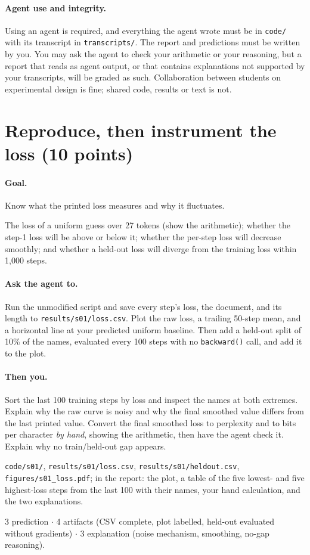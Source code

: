 \documentclass[11pt,letterpaper]{article}
\newcommand{\agent}[1]{\paragraph{Ask the agent to.} #1}
\newcommand{\you}[1]{\paragraph{Then you.} #1}
\newcommand{\goal}[1]{\paragraph{Goal.} #1}
\begin{document}
\paragraph{Agent use and integrity.} Using an agent is required, and everything the agent wrote must be in \texttt{code/} with its transcript in \texttt{transcripts/}. The report and predictions must be written by you. You may ask the agent to check your arithmetic or your reasoning, but a report that reads as agent output, or that contains explanations not supported by your transcripts, will be graded as such. Collaboration between students on experimental design is fine; shared code, results or text is not.

\clearpage
\section{Reproduce, then instrument the loss \hfill (10 points)}
\goal{Know what the printed loss measures and why it fluctuates.}
\begin{predict}
The loss of a uniform guess over 27 tokens (show the arithmetic); whether the step-1 loss will be above or below it; whether the per-step loss will decrease smoothly; and whether a held-out loss will diverge from the training loss within 1{,}000 steps.
\end{predict}
\agent{Run the unmodified script and save every step's loss, the document, and its length to \texttt{results/s01/loss.csv}. Plot the raw loss, a trailing 50-step mean, and a horizontal line at your predicted uniform baseline. Then add a held-out split of 10\% of the names, evaluated every 100 steps with no \texttt{backward()} call, and add it to the plot.}
\you{Sort the last 100 training steps by loss and inspect the names at both extremes. Explain why the raw curve is noisy and why the final smoothed value differs from the last printed value. Convert the final smoothed loss to perplexity and to bits per character \emph{by hand}, showing the arithmetic, then have the agent check it. Explain why no train/held-out gap appears.}
\begin{deliver}
\texttt{code/s01/}, \texttt{results/s01/loss.csv}, \texttt{results/s01/heldout.csv}, \texttt{figures/s01\_loss.pdf}; in the report: the plot, a table of the five lowest- and five highest-loss steps from the last 100 with their names, your hand calculation, and the two explanations.
\end{deliver}
\begin{rubric}3 prediction $\cdot$ 4 artifacts (CSV complete, plot labelled, held-out evaluated without gradients) $\cdot$ 3 explanation (noise mechanism, smoothing, no-gap reasoning).\end{rubric}
\end{document}
